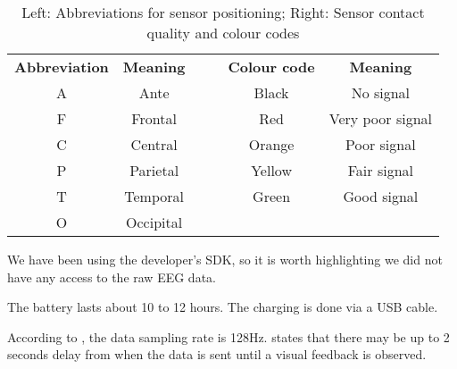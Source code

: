 \begin{table}[h]
\centering
\begin{tabular}{|c|c|llcc}
\cline{1-2} \cline{5-6}
\textbf{Abbreviation} & \textbf{Meaning} &  & \multicolumn{1}{l|}{} & \multicolumn{1}{c|}{\textbf{Colour code}}          & \multicolumn{1}{c|}{\textbf{Meaning}} \\ \cline{1-2} \cline{5-6} 
A                     & Ante             &  & \multicolumn{1}{l|}{} & \multicolumn{1}{c|}{Black}                         & \multicolumn{1}{c|}{No signal}        \\ \cline{1-2} \cline{5-6} 
F                     & Frontal          &  & \multicolumn{1}{l|}{} & \multicolumn{1}{c|}{{\color[HTML]{FE0000} Red}}    & \multicolumn{1}{c|}{Very poor signal} \\ \cline{1-2} \cline{5-6} 
C                     & Central          &  & \multicolumn{1}{l|}{} & \multicolumn{1}{c|}{{\color[HTML]{F8A102} Orange}} & \multicolumn{1}{c|}{Poor signal}      \\ \cline{1-2} \cline{5-6} 
P                     & Parietal         &  & \multicolumn{1}{l|}{} & \multicolumn{1}{c|}{{\color[HTML]{F8FF00} Yellow}} & \multicolumn{1}{c|}{Fair signal}      \\ \cline{1-2} \cline{5-6} 
T                     & Temporal         &  & \multicolumn{1}{l|}{} & \multicolumn{1}{c|}{{\color[HTML]{32CB00} Green}}  & \multicolumn{1}{c|}{Good signal}      \\ \cline{1-2} \cline{5-6} 
O                     & Occipital        &  &                       & \multicolumn{1}{l}{}                               & \multicolumn{1}{l}{}                  \\ \cline{1-2}
\end{tabular}
\caption {Left: Abbreviations for sensor positioning; Right: Sensor contact quality and colour codes}
\label{table:sensorName}
\end{table}

We have been using the developer's SDK, so it is worth highlighting we did not have any access to the raw EEG data. 

The battery lasts about 10 to 12 hours. The charging is done via a USB cable.

According to \cite{experimenterEPOC}, the data sampling rate is 128Hz. \cite{emotivUserManual} states that there may be up to 2 seconds delay from when the data is sent until a visual feedback is observed. 

